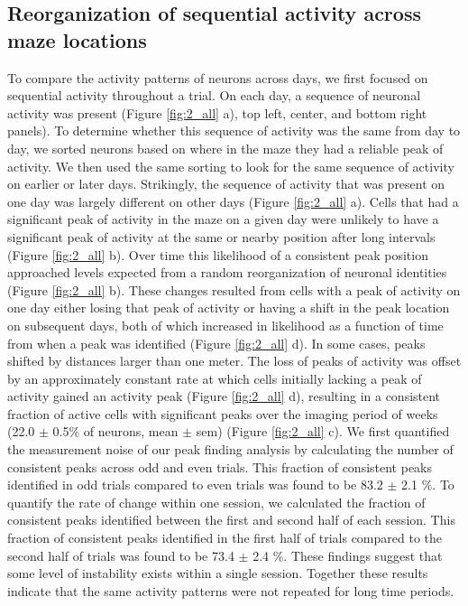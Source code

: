 \subsection{Reorganization of sequential activity across maze locations} \label{sec:chap3_peaks}
To compare the activity patterns of neurons across days, we first focused on sequential activity throughout a trial. On each day, a sequence of neuronal activity was present (Figure \ref{fig:2_all} a), top left, center, and bottom right panels). To determine whether this sequence of activity was the same from day to day, we sorted neurons based on where in the maze they had a reliable peak of activity. We then used the same sorting to look for the same sequence of activity on earlier or later days. Strikingly, the sequence of activity that was present on one day was largely different on other days (Figure \ref{fig:2_all} a). Cells that had a significant peak of activity in the maze on a given day were unlikely to have a significant peak of activity at the same or nearby position after long intervals (Figure \ref{fig:2_all} b). Over time this likelihood of a consistent peak position approached levels expected from a random reorganization of neuronal identities (Figure \ref{fig:2_all} b). These changes resulted from cells with a peak of activity on one day either losing that peak of activity or having a shift in the peak location on subsequent days, both of which increased in likelihood as a function of time from when a peak was identified (Figure \ref{fig:2_all} d). In some cases, peaks shifted by distances larger than one meter. The loss of peaks of activity was offset by an approximately constant rate at which cells initially lacking a peak of activity gained an activity peak (Figure \ref{fig:2_all} d), resulting in a consistent fraction of active cells with significant peaks over the imaging period of weeks (22.0 $\pm$ 0.5$\%$ of neurons, mean $\pm$ sem) (Figure \ref{fig:2_all} c). We first quantified the measurement noise of our peak finding analysis by calculating the number of consistent peaks across odd and even trials. This fraction of consistent peaks identified in odd trials compared to even trials was found to be 83.2 $\pm$ 2.1  $\%$. To quantify the rate of change within one session, we calculated the fraction of consistent peaks identified between the first and second half of each session. This fraction of consistent peaks identified in the first half of trials compared to the second half of trials was found to be 73.4 $\pm$ 2.4  $\%$. These findings suggest that some level of instability exists within a single session. Together these results indicate that the same activity patterns were not repeated for long time periods.

